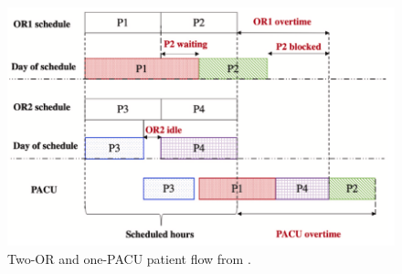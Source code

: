     \begin{figure}[H]
        \centering
        \includegraphics[width=.9\textwidth]{figures/0015_SR04US22/fig3.png}
        \caption{Two-OR and one-PACU patient flow from \cite{x335}.}
        \label{fig3:0015_SR04US22}
    \end{figure}

